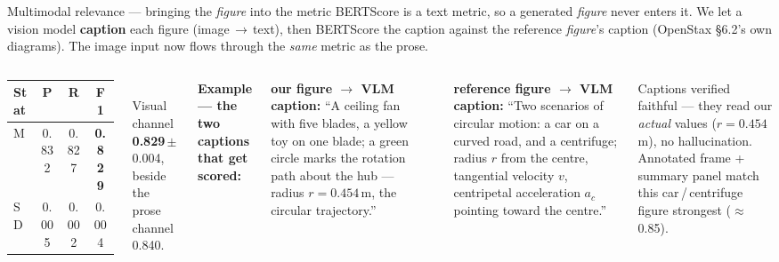 \documentclass[aspectratio=169,10pt]{beamer}
\newcommand{\hl}[1]{{\bfseries\color{cAccent}#1}}
\begin{document}
\begin{frame}{Multimodal relevance --- bringing the \emph{figure} into the metric}
\small
BERTScore is a text metric, so a generated \emph{figure} never enters it. We let a vision model
\hl{caption} each figure (image\,$\to$\,text), then BERTScore the caption against the reference
\emph{figure}'s caption (OpenStax \S6.2's own diagrams). The image input now flows through the
\emph{same} metric as the prose.
\vspace{0.3em}
\begin{columns}[T]
\centering
{\footnotesize
\begin{tabular}{lccc}
\toprule
\textbf{Stat} & \textbf{P} & \textbf{R} & \textbf{F1} \\
\midrule
M  & 0.832 & 0.827 & \hl{0.829} \\
SD & 0.005 & 0.002 & 0.004 \\
\bottomrule
\end{tabular}}\\[3pt]
{\scriptsize Visual channel \hl{0.829}\,$\pm$\,0.004, beside the prose channel 0.840.}\\[6pt]
{\tiny\textbf{Example --- the two captions that get scored:}}
\begin{tcolorbox}[colback=cPed!5,colframe=cPed!45,boxrule=0.3pt,left=3pt,right=3pt,top=2pt,bottom=2pt]
{\tiny\textbf{\color{cPed}our figure $\to$ VLM caption:} ``A ceiling fan with five blades, a yellow toy
on one blade; a green circle marks the rotation path about the hub --- radius $r=0.454$\,m, the
circular trajectory.''}
\end{tcolorbox}
\vspace{1pt}\\[1pt]
\begin{tcolorbox}[colback=cMeas!5,colframe=cMeas!45,boxrule=0.3pt,left=3pt,right=3pt,top=2pt,bottom=2pt]
{\tiny\textbf{\color{cMeas}reference figure $\to$ VLM caption:} ``Two scenarios of circular motion:
a car on a curved road, and a centrifuge; radius $r$ from the centre, tangential velocity $v$,
centripetal acceleration $a_c$ pointing toward the centre.''}
\end{tcolorbox}
\vspace{2pt}
{\tiny Captions verified faithful --- they read our \emph{actual} values ($r=0.454$\,m), no
hallucination. Annotated frame + summary panel match this car\,/\,centrifuge figure strongest ($\approx$0.85).}
\end{columns}
\end{frame}
\end{document}
